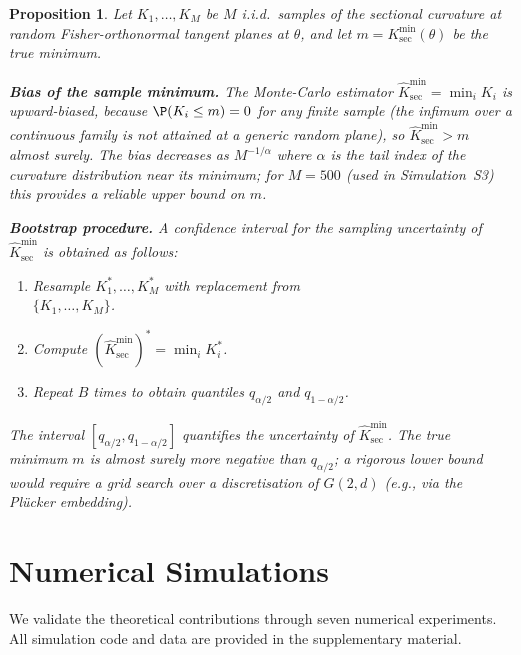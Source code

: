 \documentclass[a4paper,fleqn]{cas-dc}
\newtheorem{proposition}{Proposition}
\begin{document}
\begin{proposition}%
  \label{prop:kmin_confidence}
  Let $K_1, \ldots, K_M$ be $M$ i.i.d.\ samples of the sectional curvature
  at random Fisher-orthonormal tangent planes at $\theta$, and let
  $m = K_{\sec}^{\min}(\theta)$ be the true minimum.

  \textbf{Bias of the sample minimum.}
  The Monte-Carlo estimator $\widehat{K}_{\sec}^{\min} = \min_i K_i$ is
  \emph{upward-biased}, because $\P(K_i \leq m)=0$ for any finite sample
  (the infimum over a continuous family is not attained at a generic
  random plane), so $\widehat{K}_{\sec}^{\min} > m$ almost surely.
  The bias decreases as $M^{-1/\alpha}$ where $\alpha$ is the tail index
  of the curvature distribution near its minimum; for $M = 500$
  (used in Simulation~S3) this provides a reliable upper bound on $m$.

  \textbf{Bootstrap procedure.}
  A confidence interval for the \emph{sampling uncertainty} of
  $\widehat{K}_{\sec}^{\min}$ is obtained as follows:
  \begin{enumerate}
    \item Resample $K_1^*, \ldots, K_M^*$ with replacement from\\
          $\{K_1, \ldots, K_M\}$.
    \item Compute $(\widehat{K}_{\sec}^{\min})^* = \min_i K_i^*$.
    \item Repeat $B$ times to obtain quantiles $q_{\alpha/2}$ and
          $q_{1-\alpha/2}$.
  \end{enumerate}
  The interval $[q_{\alpha/2}, q_{1-\alpha/2}]$ quantifies the
  uncertainty of $\widehat{K}_{\sec}^{\min}$.
  The true minimum $m$ is almost surely more negative than $q_{\alpha/2}$;
  a rigorous lower bound would require a grid search over a
  discretisation of $G(2, d)$ (e.g., via the Pl\"{u}cker embedding).
\end{proposition}

\section{Numerical Simulations}
\label{sec:simulations}

We validate the theoretical contributions through seven numerical
experiments.  All simulation code and data are provided in the
supplementary material.
\end{document}

